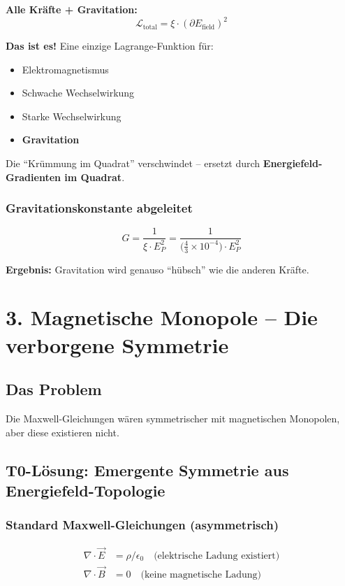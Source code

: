 	\textbf{Alle Kräfte + Gravitation:}
	\[
	\boxed{\mathcal{L}_{\text{total}} = \xi \cdot (\partial E_{\text{field}})^2}
	\]
	
	\textbf{Das ist es!} Eine einzige Lagrange-Funktion für:
	\begin{itemize}
		\item Elektromagnetismus
		\item Schwache Wechselwirkung
		\item Starke Wechselwirkung
		\item \textbf{Gravitation}
	\end{itemize}
	
	Die ``Krümmung im Quadrat'' verschwindet – ersetzt durch \textbf{Energiefeld-Gradienten im Quadrat}.
	
	\subsubsection*{Gravitationskonstante abgeleitet}
	\[
	G = \frac{1}{\xi \cdot E_P^2} = \frac{1}{\bigl(\frac{4}{3} \times 10^{-4}\bigr) \cdot E_P^2}
	\]
	
	\textbf{Ergebnis:} Gravitation wird genauso ``hübsch'' wie die anderen Kräfte.
	
	
	
	\section*{3. Magnetische Monopole – Die verborgene Symmetrie}
	
	\subsection*{Das Problem}
	Die Maxwell-Gleichungen wären symmetrischer mit magnetischen Monopolen, aber diese existieren nicht.
	
	\subsection*{T0-Lösung: Emergente Symmetrie aus Energiefeld-Topologie}
	
	\subsubsection*{Standard Maxwell-Gleichungen (asymmetrisch)}
	\begin{align*}
		\nabla \cdot \vec{E} &= \rho/\epsilon_0 \quad \text{(elektrische Ladung existiert)} \\
		\nabla \cdot \vec{B} &= 0 \quad \text{(keine magnetische Ladung)}
	\end{align*}
	
